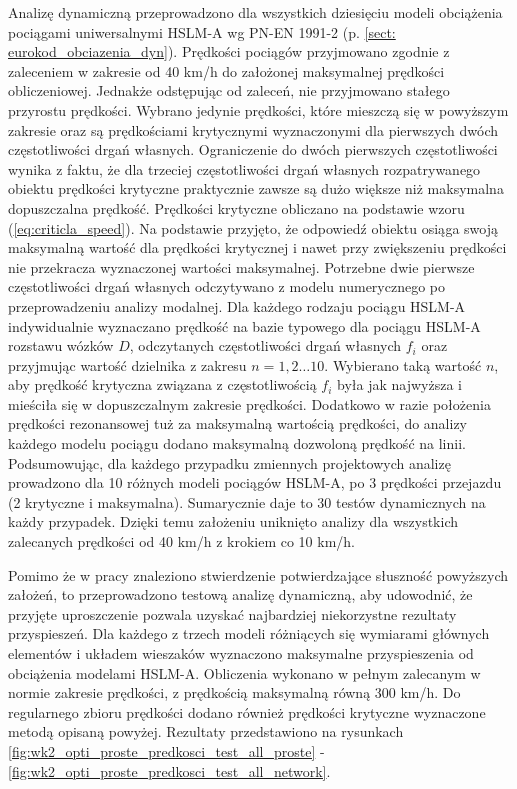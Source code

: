 Analizę dynamiczną przeprowadzono dla wszystkich dziesięciu modeli obciążenia pociągami uniwersalnymi HSLM-A wg PN-EN 1991-2 (p. \ref{sect: eurokod_obciazenia_dyn}). Prędkości pociągów przyjmowano zgodnie z zaleceniem w zakresie od 40 km/h do założonej maksymalnej prędkości obliczeniowej. Jednakże odstępując od zaleceń, nie przyjmowano stałego przyrostu prędkości. Wybrano jedynie prędkości, które mieszczą się w powyższym zakresie oraz są prędkościami krytycznymi wyznaczonymi dla pierwszych dwóch częstotliwości drgań własnych.  Ograniczenie do dwóch pierwszych częstotliwości wynika z faktu, że dla trzeciej częstotliwości drgań własnych rozpatrywanego obiektu prędkości krytyczne praktycznie zawsze są dużo większe niż maksymalna dopuszczalna prędkość. Prędkości krytyczne obliczano na podstawie wzoru (\ref{eq:criticla_speed}). Na podstawie \parencite{Goicolea2008} przyjęto, że odpowiedź obiektu osiąga swoją maksymalną wartość dla prędkości krytycznej i nawet przy zwiększeniu prędkości nie przekracza wyznaczonej wartości maksymalnej. Potrzebne dwie pierwsze częstotliwości drgań własnych odczytywano z modelu numerycznego po przeprowadzeniu analizy modalnej. Dla każdego rodzaju pociągu HSLM-A indywidualnie wyznaczano prędkość na bazie typowego dla pociągu HSLM-A rozstawu wózków $D$, odczytanych częstotliwości drgań własnych $f_i$ oraz przyjmując wartość dzielnika z zakresu $n = 1,2\dots 10$. Wybierano taką wartość $n$, aby prędkość krytyczna związana z częstotliwością $f_i$ była jak najwyższa i mieściła się w dopuszczalnym zakresie prędkości. Dodatkowo w razie położenia prędkości rezonansowej tuż za maksymalną wartością prędkości, do analizy każdego modelu pociągu dodano maksymalną dozwoloną prędkość na linii. Podsumowując, dla każdego przypadku zmiennych projektowych analizę prowadzono dla 10 różnych modeli pociągów HSLM-A, po 3 prędkości przejazdu (2 krytyczne i maksymalna). Sumarycznie daje to 30 testów dynamicznych na każdy przypadek. Dzięki temu założeniu uniknięto analizy dla wszystkich zalecanych prędkości od 40 km/h z krokiem co 10 km/h. 

Pomimo że w pracy \parencite{Goicolea2008} znaleziono stwierdzenie potwierdzające słuszność powyższych założeń, to przeprowadzono testową analizę dynamiczną, aby udowodnić, że przyjęte uproszczenie pozwala uzyskać najbardziej niekorzystne rezultaty przyspieszeń. Dla każdego z trzech modeli różniących się wymiarami głównych elementów i układem wieszaków wyznaczono maksymalne przyspieszenia od obciążenia modelami HSLM-A. Obliczenia wykonano w pełnym zalecanym w normie zakresie prędkości, z prędkością maksymalną równą 300 km/h. Do regularnego zbioru prędkości dodano również prędkości krytyczne wyznaczone metodą opisaną powyżej. Rezultaty przedstawiono na rysunkach \ref{fig:wk2_opti_proste_predkosci_test_all_proste} - \ref{fig:wk2_opti_proste_predkosci_test_all_network}. 

